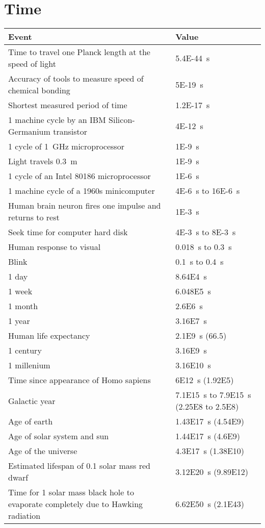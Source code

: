 \documentclass{article}
\begin{document}
\section{Time}
\begin{table}[H]
	\centering
	\begin{tabularx}{\textwidth}{ X X }
		Event & Value \\
		\hline
		Time to travel one Planck length at the speed of light & \SI{5.4E-44}{\second} \\
		Accuracy of tools to measure speed of chemical bonding & \SI{5E-19}{\second} \\
		Shortest measured period of time & \SI{1.2E-17}{\second} \\
		1 machine cycle by an IBM Silicon-Germanium transistor & \SI{4E-12}{\second} \\
		1 cycle of \SI{1}{\giga\hertz} microprocessor & \SI{1E-9}{\second} \\
		Light travels \SI{0.3}{\meter} & \SI{1E-9}{\second} \\
		1 cycle of an Intel 80186 microprocessor & \SI{1E-6}{\second} \\
		1 machine cycle of a 1960s minicomputer & \SI{4E-6}{\second} to \SI{16E-6}{\second} \\
		Human brain neuron fires one impulse and returns to rest & \SI{1E-3}{\second} \\
		Seek time for computer hard disk & \SI{4E-3}{\second} to \SI{8E-3}{\second} \\
		Human response to visual & \SI{0.018}{\second} to \SI{0.3}{\second} \\
		Blink & \SI{0.1}{\second} to \SI{0.4}{\second} \\
		1 day & \SI{8.64E4}{\second} \\
		1 week & \SI{6.048E5}{\second} \\
		1 month & \SI{2.6E6}{\second} \\
		1 year & \SI{3.16E7}{\second} \\
		Human life expectancy & \SI{2.1E9}{\second} (\SI{66.5}{\year})\\
		1 century & \SI{3.16E9}{\second} \\
		1 millenium & \SI{3.16E10}{\second} \\
		Time since appearance of Homo sapiens & \SI{6E12}{\second} (\SI{1.92E5}{\year}) \\
		Galactic year & \SI{7.1E15}{\second} to \SI{7.9E15}{\second} (\SI{2.25E8}{\year} to \SI{2.5E8}{\year}) \\
		Age of earth & \SI{1.43E17}{\second} (\SI{4.54E9}{\year}) \\
		Age of solar system and sun & \SI{1.44E17}{\second} (\SI{4.6E9}{\year}) \\
		Age of the universe & \SI{4.3E17}{\second} (\SI{1.38E10}{\year}) \\
		Estimated lifespan of 0.1 solar mass red dwarf & \SI{3.12E20}{\second} (\SI{9.89E12}{\year}) \\
		Time for 1 solar mass black hole to evaporate completely due to Hawking radiation & \SI{6.62E50}{\second} (\SI{2.1E43}{\year}) \\
	\end{tabularx}
\end{table}
\end{document}
